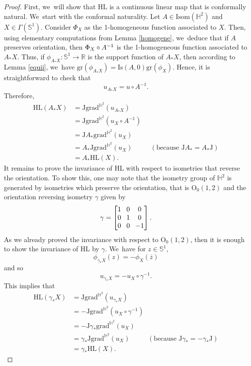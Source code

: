 \documentclass[JEP,XML,SOM,Unicode,NoEqCountersInSection, NoFloatCountersInSection,published]{cedram}
\theoremstyle{plain}
\theoremstyle{definition}
\newcommand{\grad}{\mathrm{grad}^{\mathbb{H}^2}}
\newcommand{\J}{\mathrm{J}}
\begin{document}
\begin{proof}
First, we~will show that $\mathrm{HL}$ is a continuous linear map that is conformally natural. We~start with the conformal naturality. Let $A \in \mathrm{Isom}(\mathbb{H}^2)$ and $X \in \Gamma(\mathbb{S}^1)$. Consider $\Phi_X$ as the 1-homogeneous function associated to $X$. Then, using elementary computations from Lemma \ref{homogene}, we~deduce that if $A$ preserves orientation, then $\Phi_X \circ\nobreak A^{-1}$ is the 1-homogeneous function associated to $A_* X$. Thus, if $\phi_{A_* X}:\mathbb{S}^1 \to \mathbb{R}$ is the support function of $A_* X$, then according to Lemma \ref{equii}, we~have $\mathrm{gr}(\phi_{A_* X}) = \mathrm{Is}(A, 0) \mathrm{gr}(\phi_X)$. Hence, it is straightforward to check that
\[
u_{A_*X}=u\circ A^{-1}.
\]
Therefore,
\begin{align*}
\mathrm{HL}(A_*X)&=\J\grad(u_{A_*X})\\
&=\J\grad(u_X\circ A^{-1})\\
&=\J A_* \grad(u_X)\\
&=A_*\J\grad(u_X) \ \ \ \ \ \ \ \ \ \ \ \ (\text{because $\J A_*=A_*\J$})\\
&=A_*\mathrm{HL}(X).
\end{align*}
It remains to prove the invariance of $\mathrm{HL}$ with respect to isometries that reverse the orientation. To show this, one may note that the isometry group of $\mathbb{H}^2$ is generated by isometries which preserve the orientation, that is $\mathrm{O}_0(1,2)$ and the orientation reversing isometry $\gamma$ given by
\[\arraycolsep4pt
\gamma=\begin{bmatrix}
1 & 0 & 0 \\
0 & 1 & 0 \\
0 & 0 & -1
\end{bmatrix}.
\]
As we already proved the invariance with respect to $\mathrm{O}_0(1,2)$, then it is enough to show the invariance of $\mathrm{HL}$ by $\gamma$. We~have for $z \in \mathbb{S}^1$,
\[
\phi_{\gamma_*X}(z)=-\phi_X(\overline{z})
\]
and so
\[
u_{\gamma_*X}=-u_X\circ\gamma^{-1}.
\]
This implies that \begin{align*}
\mathrm{HL}(\gamma_*X)&=\J\grad(u_{\gamma_*X})\\
&=-\J\grad(u_X\circ \gamma^{-1})\\
&=-\J \gamma_* \grad(u_X)\\
&=\gamma_*\J\grad(u_X) \ \ \ \ \ \ \ \ \ \ \ \ (\text{because $\J \gamma_*=-\gamma_*\J$})\\
&=\gamma_*\mathrm{HL}(X).
\end{align*}

\end{proof}
\end{document}

